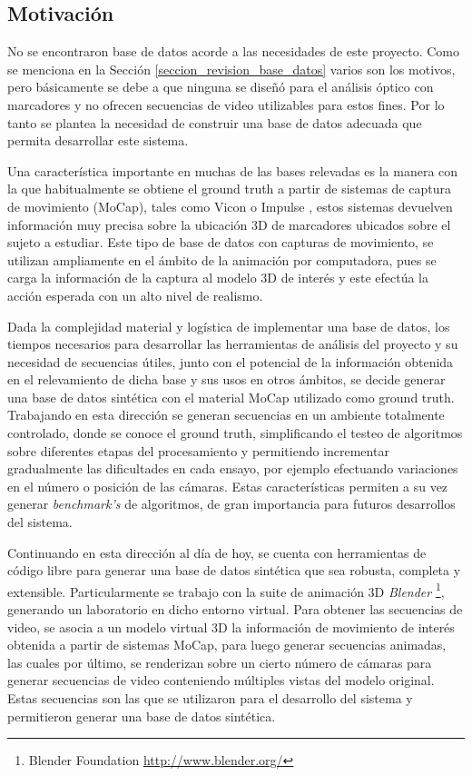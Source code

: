 \subsection{Motivación}

No se encontraron base de datos acorde a las necesidades de este proyecto. Como se menciona en la Sección \ref{seccion_revision_base_datos} varios son los motivos, pero básicamente se debe a que ninguna se diseñó para el análisis óptico  con marcadores y no ofrecen secuencias de video utilizables para estos fines. Por lo tanto se plantea la necesidad de construir una base de datos adecuada que permita desarrollar este sistema.


Una característica importante en muchas de las bases relevadas es la manera con la que habitualmente se obtiene el ground truth a partir de sistemas de captura de movimiento (MoCap), tales como Vicon \cite{vicon} o Impulse \cite{vicon},
estos sistemas devuelven información muy precisa sobre la ubicación 3D de marcadores ubicados sobre el sujeto a estudiar. Este tipo de base de datos con capturas de movimiento, se utilizan ampliamente en el ámbito de la animación por computadora, pues se carga la información de la captura al modelo 3D de interés y este efectúa la acción esperada con un alto nivel de realismo. 


Dada la complejidad material y logística de implementar una base de datos, los tiempos necesarios para desarrollar las herramientas de análisis del proyecto y su necesidad de secuencias útiles, junto con el potencial de la información obtenida en el relevamiento de dicha base y sus usos en otros ámbitos, se decide generar una base de datos sintética con el material MoCap utilizado como ground truth. Trabajando en esta dirección se generan secuencias en un ambiente totalmente controlado, donde se conoce el ground truth, simplificando el testeo de algoritmos sobre diferentes etapas del procesamiento y permitiendo incrementar gradualmente las dificultades  en cada ensayo, por ejemplo efectuando variaciones en el número o posición de las cámaras. Estas características permiten a su vez generar \emph{benchmark's} de algoritmos, de gran importancia para futuros desarrollos del sistema. 


Continuando en esta dirección al día de hoy, se cuenta con herramientas de código libre para generar una base de datos sintética que sea robusta, completa y extensible. Particularmente se trabajo con la suite de animación 3D \textit{Blender} \footnote{ Blender Foundation \textcolor{blue}{\underline{\url{http://www.blender.org/}}}}, generando un laboratorio en dicho entorno virtual. Para obtener las secuencias de video, se asocia a un modelo  virtual 3D la información de movimiento de interés obtenida a partir de sistemas MoCap, para luego generar secuencias animadas, las cuales por último, se renderizan sobre un cierto número de cámaras para generar secuencias de video conteniendo múltiples vistas del modelo original. Estas secuencias son las que se utilizaron para el desarrollo del sistema y permitieron generar una base de datos sintética. 


